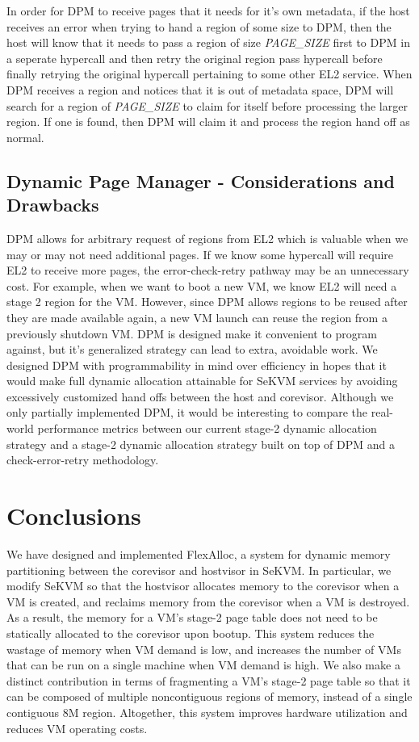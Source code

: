 In order for DPM to receive pages that it needs for it's own metadata, if the host receives an
error when trying to hand a region of some size to DPM, then the host will know that it needs
to pass a region of size \textit{PAGE\_SIZE} first to DPM in a seperate hypercall and then retry the
original region pass hypercall before finally retrying the original hypercall pertaining
to some other EL2 service. When DPM receives a region and notices that it is out of metadata
space, DPM will search for a region of \textit{PAGE\_SIZE} to claim for itself before processing
the larger region. If one is found, then DPM will claim it and process the region hand off
as normal.

\subsection{Dynamic Page Manager - Considerations and Drawbacks}
DPM allows for arbitrary request of regions from EL2 which is valuable when we may or may not
need additional pages. If we know some hypercall will require EL2 to receive more pages,
the error-check-retry pathway may be an unnecessary cost. For example, when we want to
boot a new VM, we know EL2 will need a stage 2 region for the VM. However, since DPM allows
regions to be reused after they are made available again, a new VM launch can reuse the
region from a previously shutdown VM. DPM is designed make it convenient to program against,
but it’s generalized strategy can lead to extra, avoidable work. We designed DPM with
programmability in mind over efficiency in hopes that it would make full dynamic allocation
attainable for SeKVM services by avoiding excessively customized hand offs between the host
and corevisor. Although we only partially implemented DPM, it would be interesting to
compare the real-world performance metrics between our current stage-2 dynamic allocation
strategy and a stage-2 dynamic allocation strategy built on top of DPM and a
check-error-retry methodology.


\section{Conclusions}

We have designed and implemented FlexAlloc, a system for dynamic memory
partitioning between the corevisor and hostvisor in SeKVM. In particular, we
modify SeKVM so that the hostvisor allocates memory to the corevisor when a VM is
created, and reclaims memory from the corevisor when a VM is destroyed. As a
result, the memory for a VM's stage-2 page table does not need to be statically
allocated to the corevisor upon bootup. This system reduces the wastage of memory
when VM demand is low, and increases the number of VMs that can be run
on a single machine when VM demand is high. We also make a distinct contribution in terms of fragmenting
a VM's stage-2 page table so that it can be composed of multiple noncontiguous
regions of memory, instead of a single contiguous 8M region. Altogether, this
system improves hardware utilization and reduces VM operating costs.

